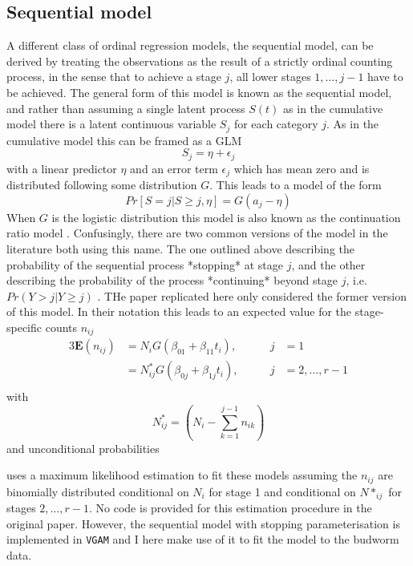\citet{dennis1986stochastic}

\subsection{Sequential model}
A different class of ordinal regression models, the sequential model, can be derived by treating the observations as the result of a strictly ordinal counting process, in the sense that to achieve a stage $j$, all lower stages $1,\dots,j-1$ have to be achieved. The general form of this model is known as the sequential model, and rather than assuming a single latent process $S(t)$ as in the cumulative model there is a latent continuous variable $S_j$ for each category $j$. As in the cumulative model this can be framed as a GLM 
\begin{equation}
S_j = \eta + \epsilon_j
\end{equation}
with a linear predictor $\eta$ and an error term $\epsilon_j$ which has mean zero and is distributed following some distribution $G$. This leads to a model of the form 
\begin{equation}
Pr[S = j|S \geq j, \eta] = G(a_j - \eta)
\end{equation}
When $G$ is the logistic distribution this model is also known as the continuation ratio model \citep{fienberg1980analysis}. Confusingly, there are two common versions of the model in the literature both using this name. The one outlined above describing the probability of the sequential process *stopping* at stage $j$, and the other describing the probability of the process *continuing* beyond stage $j$, i.e. $Pr(Y > j | Y \geq j)$ \citep{VGAM, burkner2019ordinal}. THe paper replicated here \citep{candy1991modeling} only considered the former version of this model.
In their notation this leads to an expected value for the stage-specific counts $n_{ij}$
\begin{alignat}{3}
\mathbf{E}(n_{ij})&=N_i G(\beta_{01} + \beta_{11}t_i), &j&=1\\
&=N^*_{ij} G(\beta_{0j} + \beta_{1j}t_i), \qquad &j&=2,\dots,r-1\\
\end{alignat}
with 
$$N^*_{ij}=\left(N_i - \sum_{k=1}^{j-1}n_{ik}\right) $$
and unconditional probabilities 

\citet{candy1991modeling} uses a maximum likelihood estimation to fit these models assuming the $n_{ij}$ are binomially distributed conditional on $N_i$ for stage 1 and conditional on $N*_{ij}$ for stages $2,\dots,r-1$. No code is provided for this estimation procedure in the original paper. However, the sequential model with stopping parameterisation is implemented in \verb+VGAM+ \citep{VGAM} and I here make use of it to fit the model to the budworm data.


